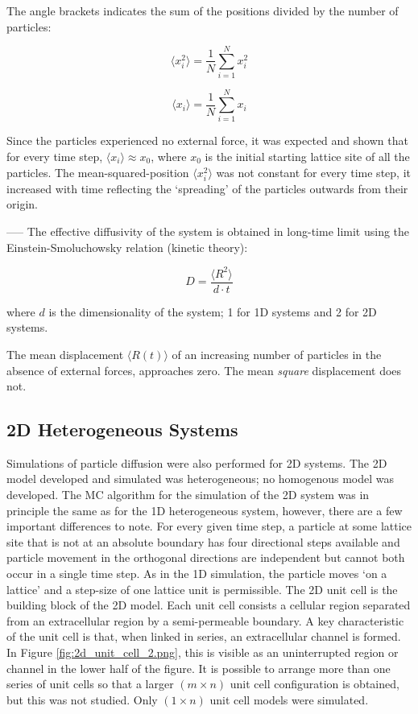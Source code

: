 	The angle brackets indicates the sum of the positions divided by the number of particles:
	
	\begin{equation}
		\langle x_{i}^2 \rangle = \dfrac{1}{N}\sum_{i=1}^{N} x_{i}^2
	\end{equation}
	
	\begin{equation}
		\langle x_{i} \rangle = \dfrac{1}{N}\sum_{i=1}^{N} x_i
	\end{equation}
	
	Since the particles experienced no external force, it was expected and shown that for every time step, $ \langle x_{i} \rangle \approx x_0 $, where $ x_0 $ is the initial starting lattice site of all the particles. The mean-squared-position $ \langle x_{i}^2 \rangle $ was not constant for every time step, it increased with time reflecting the `spreading' of the particles outwards from their origin.
	
	-----
	The effective diffusivity of the system is obtained in long-time limit using the Einstein-Smoluchowsky relation (kinetic theory):
	
	\begin{equation}
		D = \frac{\langle R^2 \rangle}{d\cdot t}
	\end{equation}
	
	where $ d $ is the dimensionality of the system; 1 for 1D systems and 2 for 2D systems.
	
	The mean displacement $ \langle R(t) \rangle $ of an increasing number of particles in the absence of external forces, approaches zero. The mean \textsl{square} displacement does not.
		
\subsection{2D Heterogeneous Systems}
	Simulations of particle diffusion were also performed for 2D systems. The 2D model developed and simulated was heterogeneous; no homogenous model was developed. The MC algorithm for the simulation of the 2D system was in principle the same as for the 1D heterogeneous system, however, there are a few important differences to note. For every given time step, a particle at some lattice site that is not at an absolute boundary has four directional steps available and particle movement in the orthogonal directions are independent but cannot both occur in a single time step. As in the 1D simulation, the particle moves `on a lattice' and a step-size of one lattice unit is permissible. The 2D unit cell is the building block of the 2D model. Each unit cell consists a cellular region separated from an extracellular region by a semi-permeable boundary. A key characteristic of the unit cell is that, when linked in series, an extracellular channel is formed. In Figure \ref{fig:2d_unit_cell_2.png}, this is visible as an uninterrupted region or channel in the lower half of the figure. It is possible to arrange more than one series of unit cells so that a larger $\left(  m \times n \right) $ unit cell configuration is obtained, but this was not studied. Only $\left(  1 \times n \right) $ unit cell models were simulated. 
	
